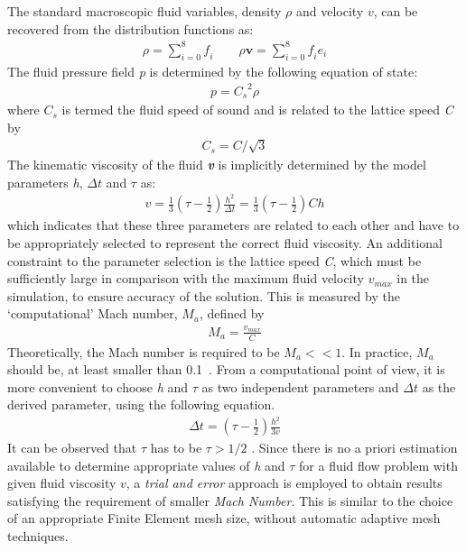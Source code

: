 The standard macroscopic fluid variables, density $\rho$ and velocity $\mathbf{\mathit{ v}}$, can be recovered from the distribution functions as:
\begin{align}
\rho = \sum\limits_{\mathit{i}=0}^{8}{\mathit{f_i}} \qquad \rho \mathbf{v} = \sum\limits_{\mathit{i}=0}^{8}{\mathit{f_i}}\mathbf{\mathit{e_i}}
\end{align}
The fluid pressure field \textit{p} is determined by the following equation of state:
\begin{align}
\mathit{p}=\mathit{C_s}^{2} \rho
\end{align}
where $\mathit{C_s}$ is termed the fluid speed of sound and is related to the lattice speed \textit{C} by
\begin{align}
\mathit{C_s}=\mathit{C}/\sqrt{3}
\end{align}
The kinematic viscosity of the fluid \textbf{\textit{v}} is implicitly determined by the model parameters \textit{h}, $\Delta \mathit{t}$ and $\tau$ as:
\begin{align}
\mathit{v}=\frac{1}{3}(\tau - \frac{1}{2})\frac{\mathit{h}^{2}}{\Delta \mathit{t}} = \frac{1}{3}(\tau - \frac{1}{2})\mathit{Ch}
\end{align}
which indicates that these three parameters are related to each other and have to be appropriately selected to represent the correct fluid viscosity. An additional constraint to the parameter selection is the lattice speed \textit{C}, which must be sufficiently large in comparison with the maximum fluid velocity $\mathit{v}_{\mathit{max}}$ in the simulation, to ensure accuracy of the solution. This is measured by the `computational' Mach number, $\mathit{M}_{\mathit{a}}$, defined by
\begin{align}
\mathit{M}_{\mathit{a}}=\frac{\mathit{v}_{\mathit{max}}}{\mathit{C}}
\end{align}
Theoretically, the Mach number is required to be $\mathit{M}_{\mathit{a}}<< 1$. In practice, $\mathit{M}_{\mathit{a}}$ should be, at least smaller than 0.1~\citep{He1997}. From a computational point of view, it is more convenient to choose \textit{h} and $\tau$ as two independent parameters and $\Delta \mathit{t}$ as the derived parameter, using the following equation.
\begin{align}
\Delta \mathit{t} = (\tau - \frac{1}{2}) \frac{h^{2}}{3\mathit{v}}
\end{align}
It can be observed that $\tau$ has to be $\tau > 1/2$ \citep{He1997}. Since there is no a priori estimation available to determine appropriate values of \textit{h} and $\tau$ for a fluid flow problem with given fluid viscosity $\mathit{v}$, a \textit{trial and error} approach is employed to obtain results satisfying the requirement of smaller \textit{Mach Number}. This is similar to the choice of an appropriate Finite Element mesh size, without automatic adaptive mesh techniques. 
